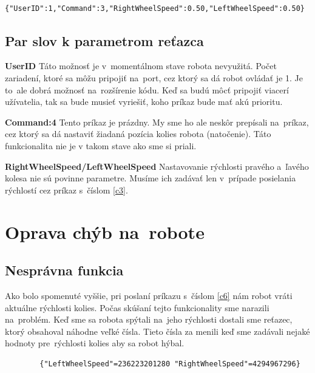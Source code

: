\label{jsonSpeedRequestGood}
\begin{lstlisting}
		{"UserID":1,"Command":3,"RightWheelSpeed":0.50,"LeftWheelSpeed":0.50}
\end{lstlisting}

\subsection{Par slov k parametrom reťazca}

\noindent \textbf{UserID} \newline
\indent Táto možnosť je v~momentálnom stave robota nevyužitá. Počet zariadení, ktoré sa môžu pripojiť na~port, cez ktorý sa dá robot ovládať je 1. Je to~ale
dobrá možnosť na~rozšírenie kódu. Keď sa budú môcť pripojiť viacerí užívatelia, tak sa bude musieť vyriešiť, koho príkaz bude mať akú prioritu. \newline

\noindent \textbf{Command:4} \newline
\indent Tento príkaz je prázdny. My sme ho ale neskôr prepísali na~príkaz, cez ktorý sa dá nastaviť žiadaná pozícia kolies robota (natočenie). Táto funkcionalita nie je
v takom stave ako sme si priali. \newline

\noindent \textbf{RightWheelSpeed/LeftWheelSpeed} \newline
\noindent Nastavovanie rýchlosti pravého a~ľavého kolesa nie sú povinne parametre. Musíme ich zadávať len v~prípade posielania rýchlostí cez príkaz s~číslom \ref{c3}.

\section{Oprava chýb na~robote}

\subsection{Nesprávna funkcia}
\indent Ako bolo spomenuté vyššie, pri poslaní príkazu s~číslom \ref{c6} nám robot vráti aktuálne rýchlosti kolies. Počas skúšaní tejto funkcionality sme narazili na~problém.
Keď sme sa robota spýtali na~jeho rýchlosti dostali sme reťazec, ktorý obsahoval náhodne veľké čísla. Tieto čísla za menili keď sme zadávali nejaké hodnoty pre~rýchlosti kolies
aby sa robot hýbal.

\label{jsonWannabeSpeed}
\begin{lstlisting}
		{"LeftWheelSpeed"=236223201280 "RightWheelSpeed"=4294967296}
\end{lstlisting}

